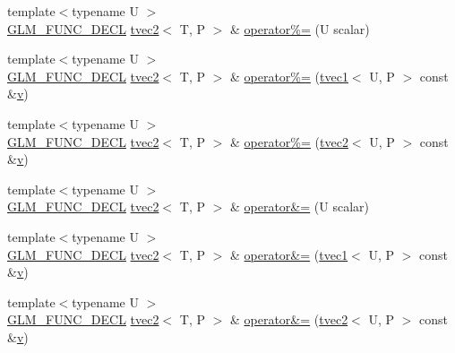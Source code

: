 \begin{DoxyCompactItemize}
\item 
{\footnotesize template$<$typename U $>$ }\\\mbox{\hyperlink{setup_8hpp_ab2d052de21a70539923e9bcbf6e83a51}{G\+L\+M\+\_\+\+F\+U\+N\+C\+\_\+\+D\+E\+CL}} \mbox{\hyperlink{structglm_1_1tvec2}{tvec2}}$<$ T, P $>$ \& \mbox{\hyperlink{structglm_1_1tvec2_a274ddf6ee49b3c7f261c784b2147f6a0}{operator\%=}} (U scalar)
\item 
{\footnotesize template$<$typename U $>$ }\\\mbox{\hyperlink{setup_8hpp_ab2d052de21a70539923e9bcbf6e83a51}{G\+L\+M\+\_\+\+F\+U\+N\+C\+\_\+\+D\+E\+CL}} \mbox{\hyperlink{structglm_1_1tvec2}{tvec2}}$<$ T, P $>$ \& \mbox{\hyperlink{structglm_1_1tvec2_a3750a63ccad2387d232a88a1abafa0aa}{operator\%=}} (\mbox{\hyperlink{structglm_1_1tvec1}{tvec1}}$<$ U, P $>$ const \&\mbox{\hyperlink{glad_8h_a14cfbe2fc2234f5504618905b69d1e06}{v}})
\item 
{\footnotesize template$<$typename U $>$ }\\\mbox{\hyperlink{setup_8hpp_ab2d052de21a70539923e9bcbf6e83a51}{G\+L\+M\+\_\+\+F\+U\+N\+C\+\_\+\+D\+E\+CL}} \mbox{\hyperlink{structglm_1_1tvec2}{tvec2}}$<$ T, P $>$ \& \mbox{\hyperlink{structglm_1_1tvec2_a3b939592b620fb6b0d7edd95c7863f0d}{operator\%=}} (\mbox{\hyperlink{structglm_1_1tvec2}{tvec2}}$<$ U, P $>$ const \&\mbox{\hyperlink{glad_8h_a14cfbe2fc2234f5504618905b69d1e06}{v}})
\item 
{\footnotesize template$<$typename U $>$ }\\\mbox{\hyperlink{setup_8hpp_ab2d052de21a70539923e9bcbf6e83a51}{G\+L\+M\+\_\+\+F\+U\+N\+C\+\_\+\+D\+E\+CL}} \mbox{\hyperlink{structglm_1_1tvec2}{tvec2}}$<$ T, P $>$ \& \mbox{\hyperlink{structglm_1_1tvec2_a5373920ff477eeccfa2307c9097af978}{operator\&=}} (U scalar)
\item 
{\footnotesize template$<$typename U $>$ }\\\mbox{\hyperlink{setup_8hpp_ab2d052de21a70539923e9bcbf6e83a51}{G\+L\+M\+\_\+\+F\+U\+N\+C\+\_\+\+D\+E\+CL}} \mbox{\hyperlink{structglm_1_1tvec2}{tvec2}}$<$ T, P $>$ \& \mbox{\hyperlink{structglm_1_1tvec2_acd64e45f039ba3b658d5a46d99fff26a}{operator\&=}} (\mbox{\hyperlink{structglm_1_1tvec1}{tvec1}}$<$ U, P $>$ const \&\mbox{\hyperlink{glad_8h_a14cfbe2fc2234f5504618905b69d1e06}{v}})
\item 
{\footnotesize template$<$typename U $>$ }\\\mbox{\hyperlink{setup_8hpp_ab2d052de21a70539923e9bcbf6e83a51}{G\+L\+M\+\_\+\+F\+U\+N\+C\+\_\+\+D\+E\+CL}} \mbox{\hyperlink{structglm_1_1tvec2}{tvec2}}$<$ T, P $>$ \& \mbox{\hyperlink{structglm_1_1tvec2_a672a9a33f367f753d0fc12116bff65bf}{operator\&=}} (\mbox{\hyperlink{structglm_1_1tvec2}{tvec2}}$<$ U, P $>$ const \&\mbox{\hyperlink{glad_8h_a14cfbe2fc2234f5504618905b69d1e06}{v}})

\end{DoxyCompactItemize}

